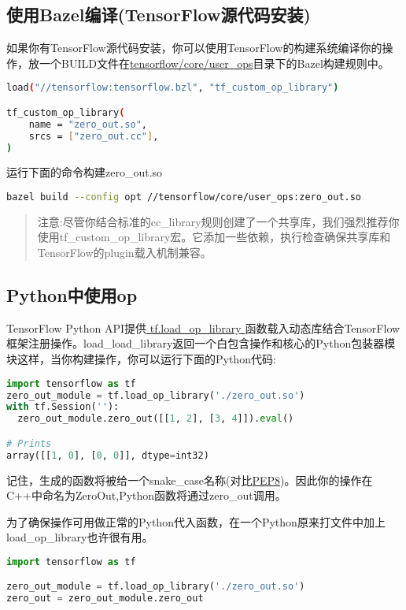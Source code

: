 \subsection{使用Bazel编译(TensorFlow源代码安装)}
如果你有TensorFlow源代码安装，你可以使用TensorFlow的构建系统编译你的操作，放一个BUILD文件在\href{https://www.github.com/tensorflow/tensorflow/blob/r1.4/tensorflow/core/user_ops/}{tensorflow/core/user\_ops}目录下的Bazel构建规则中。
\begin{lstlisting}[language=Bash]
load("//tensorflow:tensorflow.bzl", "tf_custom_op_library")

tf_custom_op_library(
    name = "zero_out.so",
    srcs = ["zero_out.cc"],
)

\end{lstlisting}
运行下面的命令构建zero\_out.so
\begin{lstlisting}[language=Bash]
bazel build --config opt //tensorflow/core/user_ops:zero_out.so
\end{lstlisting}
\begin{quote}
注意:尽管你结合标准的cc\_library规则创建了一个共享库，我们强烈推荐你使用tf\_custom\_op\_library宏。它添加一些依赖，执行检查确保共享库和TensorFlow的plugin载入机制兼容。
\end{quote}
\subsection{Python中使用op}
TensorFlow Python API提供\href{https://www.tensorflow.org/api_docs/python/tf/load_op_library?hl=zh-cn}{ tf.load\_op\_library }函数载入动态库结合TensorFlow框架注册操作。load\_load\_library返回一个白包含操作和核心的Python包装器模块这样，当你构建操作，你可以运行下面的Python代码:
\begin{lstlisting}[language=Python]
import tensorflow as tf
zero_out_module = tf.load_op_library('./zero_out.so')
with tf.Session(''):
  zero_out_module.zero_out([[1, 2], [3, 4]]).eval()

# Prints
array([[1, 0], [0, 0]], dtype=int32)

\end{lstlisting}
记住，生成的函数将被给一个snake\_case名称(对比\href{https://www.python.org/dev/peps/pep-0008/}{PEP8})。因此你的操作在C++中命名为ZeroOut,Python函数将通过zero\_out调用。

为了确保操作可用做正常的Python代入函数，在一个Python原来打文件中加上load\_op\_library也许很有用。
\begin{lstlisting}[language=Python]
import tensorflow as tf

zero_out_module = tf.load_op_library('./zero_out.so')
zero_out = zero_out_module.zero_out
\end{lstlisting}
